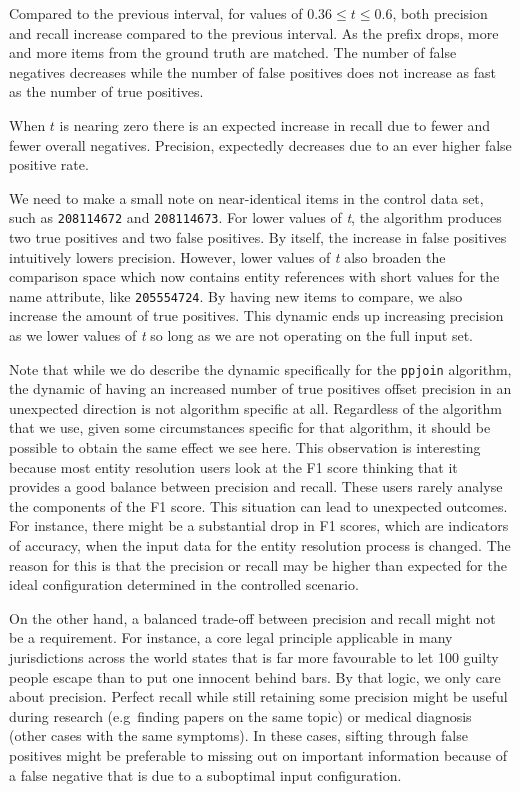 Compared to the previous interval, for values of $0.36 \leq t \le 0.6$, both
precision and recall increase compared to the previous interval.
As the prefix drops, more and more items from the ground truth are matched.
The number of false negatives decreases while the number of false positives
does not increase as fast as the number of true positives.

When $t$ is nearing zero there is an expected increase in recall due to fewer
and fewer overall negatives.
Precision, expectedly decreases due to an ever higher false positive rate.

We need to make a small note on near-identical items in the control data set,
such as \texttt{208114672} and \texttt{208114673}.
For lower values of \textit{t}, the algorithm produces two true positives and
two false positives.
By itself, the increase in false positives intuitively lowers precision.
However, lower values of \textit{t} also broaden the comparison space which
now contains entity references with short values for the name attribute,
like \texttt{205554724}.
By having new items to compare, we also increase the amount of true positives.
This dynamic ends up increasing precision as we lower values of \textit{t} so
long as we are not operating on the full input set.

Note that while we do describe the dynamic specifically for the \texttt{ppjoin}
algorithm, the dynamic of having an increased number of true positives offset
precision in an unexpected direction is not algorithm specific at all.
Regardless of the algorithm that we use, given some circumstances specific for
that algorithm, it should be possible to obtain the same effect we see here.
This observation is interesting because most entity resolution users look at the
F1 score thinking that it provides a good balance between precision and recall.
These users rarely analyse the components of the F1 score.
This situation can lead to unexpected outcomes.
For instance, there might be a substantial drop in F1 scores, which are
indicators of accuracy, when the input data for the entity resolution process is
changed.
The reason for this is that the precision or recall may be higher than expected
for the ideal configuration determined in the controlled scenario.

On the other hand, a balanced trade-off between precision and recall might not
be a requirement.
For instance, a core legal principle applicable in many jurisdictions across the
world states that is far more favourable to let 100 guilty people escape than to
put one innocent behind bars.
By that logic, we only care about precision.
Perfect recall while still retaining some precision might be useful during
research (e.g~finding papers on the same topic) or medical diagnosis (other
cases with the same symptoms).
In these cases, sifting through false positives might be preferable to missing
out on important information because of a false negative that is due to a
suboptimal input configuration.

